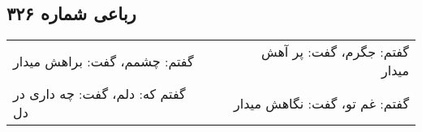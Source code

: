 \begin{center}
\section*{رباعی شماره ۳۲۶}
\label{sec:sh326}
\begin{longtable}{l p{0.5cm} r}
گفتم: چشمم، گفت: براهش میدار
&&
گفتم: جگرم، گفت: پر آهش میدار
\\
گفتم که: دلم، گفت: چه داری در دل
&&
گفتم: غم تو، گفت: نگاهش میدار
\\
\end{longtable}
\end{center}
